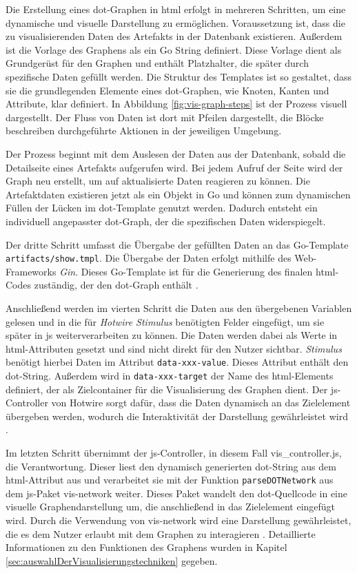 \par Die Erstellung eines \gls{dot}-Graphen in \gls{html} erfolgt in mehreren Schritten, um eine dynamische und visuelle Darstellung zu ermöglichen. Voraussetzung ist, dass die zu visualisierenden Daten des Artefakts in der Datenbank existieren. Außerdem ist die Vorlage des Graphens als ein Go String definiert. Diese Vorlage dient als Grundgerüst für den Graphen und enthält Platzhalter, die später durch spezifische Daten gefüllt werden. Die Struktur des Templates ist so gestaltet, dass sie die grundlegenden Elemente eines \gls{dot}-Graphen, wie Knoten, Kanten und Attribute, klar definiert. In Abbildung \ref{fig:vis-graph-steps} ist der Prozess visuell dargestellt. Der Fluss von Daten ist dort mit Pfeilen dargestellt, die Blöcke beschreiben durchgeführte Aktionen in der jeweiligen Umgebung.
\par Der Prozess beginnt mit dem Auslesen der Daten aus der Datenbank, sobald die Detailseite eines Artefakts aufgerufen wird. Bei jedem Aufruf der Seite wird der Graph neu erstellt, um auf aktualisierte Daten reagieren zu können. Die Artefaktdaten existieren jetzt als ein Objekt in Go und können zum dynamischen Füllen der Lücken im \gls{dot}-Template genutzt werden. Dadurch entsteht ein individuell angepasster \gls{dot}-Graph, der die spezifischen Daten widerspiegelt.
\par Der dritte Schritt umfasst die Übergabe der gefüllten Daten an das Go-Template \verb|artifacts/show.tmpl|. Die Übergabe der Daten erfolgt mithilfe des Web-Frameworks \textit{Gin}. Dieses Go-Template ist für die Generierung des finalen \gls{html}-Codes zuständig, der den \gls{dot}-Graph enthält \autocite{GingonicGinGin}.
\par Anschließend werden im vierten Schritt die Daten aus den übergebenen Variablen gelesen und in die für \textit{Hotwire Stimulus} benötigten Felder eingefügt, um sie später in \gls{js} weiterverarbeiten zu können. Die Daten werden dabei als Werte in \gls{html}-Attributen gesetzt und sind nicht direkt für den Nutzer sichtbar. \textit{Stimulus} benötigt hierbei Daten im Attribut \verb|data-xxx-value|. Dieses Attribut enthält den \gls{dot}-String. Außerdem wird in \verb|data-xxx-target| der Name des \gls{html}-Elements definiert, der als Zielcontainer für die Visualisierung des Graphen dient. Der \gls{js}-Controller von Hotwire sorgt dafür, dass die Daten dynamisch an das Zielelement übergeben werden, wodurch die Interaktivität der Darstellung gewährleistet wird \autocite{StimulusReference}.
\par Im letzten Schritt übernimmt der \gls{js}-Controller, in diesem Fall vis\_controller.js, die Verantwortung. Dieser liest den dynamisch generierten \gls{dot}-String aus dem \gls{html}-Attribut aus und verarbeitet sie mit der Funktion \verb|parseDOTNetwork| aus dem \gls{js}-Paket vis-network weiter. Dieses Paket wandelt den \gls{dot}-Quellcode in eine visuelle Graphendarstellung um, die anschließend in das Zielelement eingefügt wird. Durch die Verwendung von vis-network wird eine Darstellung gewährleistet, die es dem Nutzer erlaubt mit dem Graphen zu interagieren \autocite{VisjsVisnetwork2024}. Detaillierte Informationen zu den Funktionen des Graphens wurden in Kapitel \ref{sec:auswahlDerVisualisierungstechniken} gegeben.
